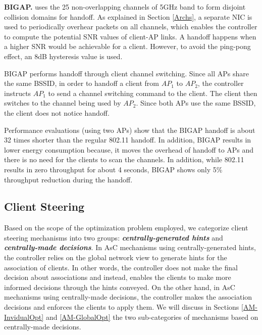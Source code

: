\textbf{BIGAP.}
\label{BIGAPhandoff}
\cite{BIGAP} uses the 25 non-overlapping channels of 5GHz band to form disjoint collision domains for handoff.
As explained in Section \ref{Archs}, a separate NIC is used to periodically overhear packets on all channels, which enables the controller to compute the potential SNR values of client-AP links.
A handoff happens when a higher SNR would be achievable for a client.
However, to avoid the ping-pong effect, an 8dB hysteresis value is used. 

BIGAP performs handoff through client channel switching.
Since all APs share the same BSSID, in order to handoff a client from $AP_{1}$ to $AP_{2}$, the controller instructs $AP_{1}$ to send a channel switching command to the client.
The client then switches to the channel being used by $AP_{2}$.
Since both APs use the same BSSID, the client does not notice handoff.

Performance evaluations (using two APs) show that the BIGAP handoff is about 32 times shorter than the regular 802.11 handoff.
In addition, BIGAP results in lower energy consumption because, it moves the overhead of handoff to APs and there is no need for the clients to scan the channels.
In addition, while 802.11 results in zero throughput for about 4 seconds, BIGAP shows only 5\% throughput reduction during the handoff.


\subsection{Client Steering}
\label{client-steering}
Based on the scope of the optimization problem employed, we categorize client steering mechanisms into two groups: \textit{\textbf{centrally-generated hints}} and \textit{\textbf{centrally-made decisions}}.
In AsC mechanisms using centrally-generated hints, the controller relies on the global network view to generate hints for the association of clients.
In other words, the controller does not make the final decision about associations and instead, enables the clients to make more informed decisions through the hints conveyed.
On the other hand, in AsC mechanisms using centrally-made decisions, the controller makes the association decisions and enforces the clients to apply them.
We will discuss in Sections \ref{AM-InvidualOpt} and \ref{AM-GlobalOpt} the two sub-categories of mechanisms based on centrally-made decisions.

